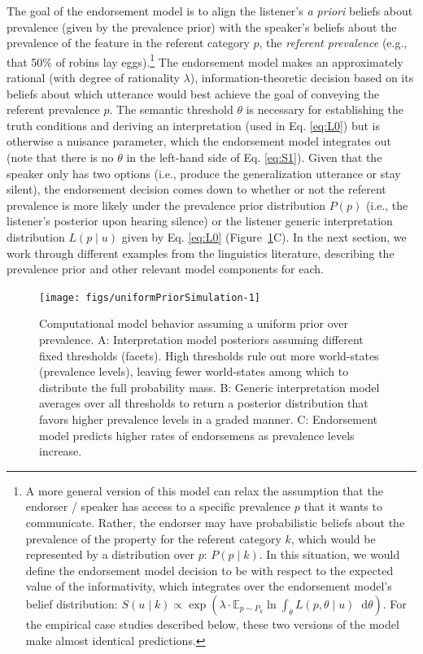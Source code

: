 \documentclass[english,,man,floatsintext]{apa6}
\let\rmarkdownfootnote\footnote%
\def\footnote{\protect\rmarkdownfootnote}
\theoremstyle{definition}
\theoremstyle{definition}
\theoremstyle{definition}
\theoremstyle{remark}
\begin{document}
The goal of the endorsement model is to align the listener's \emph{a
priori} beliefs about prevalence (given by the prevalence prior) with
the speaker's beliefs about the prevalence of the feature in the
referent category \(p\), the \emph{referent prevalence} (e.g., that 50\%
of robins lay eggs).\footnote{A more general version of this model can
  relax the assumption that the endorser / speaker has access to a
  specific prevalence \(p\) that it wants to communicate. Rather, the
  endorser may have probabilistic beliefs about the prevalence of the
  property for the referent category \(k\), which would be represented
  by a distribution over \(p\): \(P(p \mid k)\). In this situation, we
  would define the endorsement model decision to be with respect to the
  expected value of the informativity, which integrates over the
  endorsement model's belief distribution:
  \(S(u \mid k) \propto \exp{(\lambda \cdot {\mathbb E}_{p\sim P_{k}} \ln{ \int_{\theta} L(p, \theta \mid u)} \mathop{}\!\mathrm{d}\theta )}\).
  For the empirical case studies described below, these two versions of
  the model make almost identical predictions.} The endorsement model
makes an approximately rational (with degree of rationality
\(\lambda\)), information-theoretic decision based on its beliefs about
which utterance would best achieve the goal of conveying the referent
prevalence \(p\). The semantic threshold \(\theta\) is necessary for
establishing the truth conditions and deriving an interpretation (used
in Eq. \ref{eq:L0}) but is otherwise a nuisance parameter, which the
endorsement model integrates out (note that there is no \(\theta\) in
the left-hand side of Eq. \ref{eq:S1}). Given that the speaker only has
two options (i.e., produce the generalization utterance or stay silent),
the endorsement decision comes down to whether or not the referent
prevalence is more likely under the prevalence prior distribution
\(P(p)\) (i.e., the listener's posterior upon hearing silence) or the
listener generic interpretation distribution \(L(p \mid u)\) given by
Eq. \ref{eq:L0} (Figure~\ref{fig:uniformPriorSimulation}C). In the next
section, we work through different examples from the linguistics
literature, describing the prevalence prior and other relevant model
components for each.

\begin{figure}

{\centering \texttt{[image: figs/uniformPriorSimulation-1]} 

}

\caption{Computational model behavior assuming a uniform prior over prevalence. A: Interpretation model posteriors assuming different fixed thresholds (facets). High thresholds rule out more world-states (prevalence levels), leaving fewer world-states among which to distribute the full probability mass. B: Generic interpretation model averages over all thresholds to return a posterior distribution that favors higher prevalence levels in a graded manner. C: Endorsement model predicts higher rates of endorsemens as prevalence levels increase.}\label{fig:uniformPriorSimulation}
\end{figure}
\end{document}
